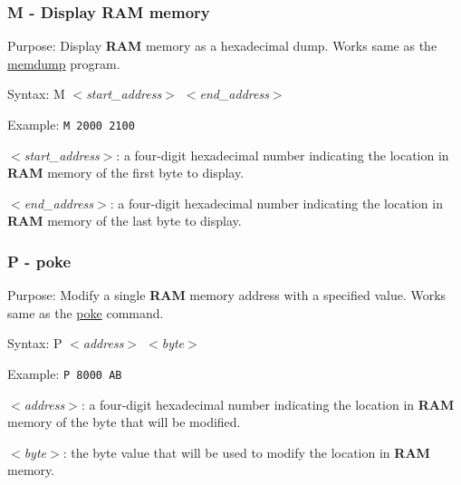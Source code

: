         \subsubsection{M - Display RAM memory}

        Purpose: Display \textbf{RAM} memory as a hexadecimal dump. Works same
        as the \hyperref[software:memdump]{memdump} program.

        Syntax: M \textit{$<$start\_address$>$ $<$end\_address$>$}

        Example: \texttt{M 2000 2100}

        \hspace{1cm}\textit{$<$start\_address$>$}: a four-digit hexadecimal
        number indicating the location in \textbf{RAM} memory of the first byte
        to display.

        \hspace{1cm}\textit{$<$end\_address$>$}: a four-digit hexadecimal
        number indicating the location in \textbf{RAM} memory of the last byte
        to display.

        \subsubsection{P - poke}

        Purpose: Modify a single \textbf{RAM} memory address with a specified
        value. Works same as the \hyperref[cmd:poke]{poke} command.

        Syntax: P \textit{$<$address$>$ $<$byte$>$}

        Example: \texttt{P 8000 AB}

        \hspace{1cm}\textit{$<$address$>$}: a four-digit hexadecimal number
        indicating the location in \textbf{RAM} memory of the byte that will be
        modified.

        \hspace{1cm}\textit{$<$byte$>$}: the byte value that will be used to
        modify the location in \textbf{RAM} memory.

